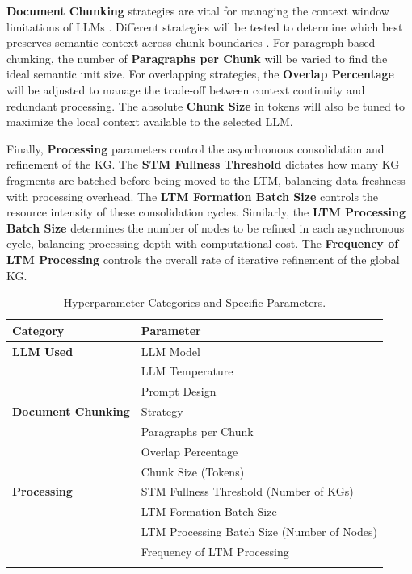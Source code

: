 \textbf{Document Chunking} strategies are vital for managing the context window limitations of LLMs \parencite{RefWorks:RefID:115-ratner2022parallel}. Different strategies will be tested to determine which best preserves semantic context across chunk boundaries \parencite{RefWorks:RefID:104-qu2024semantic}. For paragraph-based chunking, the number of \textbf{Paragraphs per Chunk} will be varied to find the ideal semantic unit size. For overlapping strategies, the \textbf{Overlap Percentage} will be adjusted to manage the trade-off between context continuity and redundant processing. The absolute \textbf{Chunk Size} in tokens will also be tuned to maximize the local context available to the selected LLM.

Finally, \textbf{Processing} parameters control the asynchronous consolidation and refinement of the KG. The \textbf{STM Fullness Threshold} dictates how many KG fragments are batched before being moved to the LTM, balancing data freshness with processing overhead. The \textbf{LTM Formation Batch Size} controls the resource intensity of these consolidation cycles. Similarly, the \textbf{LTM Processing Batch Size} determines the number of nodes to be refined in each asynchronous cycle, balancing processing depth with computational cost. The \textbf{Frequency of LTM Processing} controls the overall rate of iterative refinement of the global KG.
\begin{table}[htbp]
\centering
{}
\caption{Hyperparameter Categories and Specific Parameters.}
\label{tab:hyperparameter_exp_design}
\begin{tabularx}{\textwidth}{@{} lX @{}} 
\toprule
\textbf{Category} & \textbf{Parameter} \\
\midrule
\addlinespace
\textbf{LLM Used} & LLM Model \\
& LLM Temperature \\
& Prompt Design \\
\addlinespace
\hline
\addlinespace
\textbf{Document Chunking} & Strategy \\
& Paragraphs per Chunk \\
& Overlap Percentage \\
& Chunk Size (Tokens) \\
\addlinespace
\hline
\addlinespace
\textbf{Processing} & STM Fullness Threshold (Number of KGs) \\
& LTM Formation Batch Size \\
& LTM Processing Batch Size (Number of Nodes) \\
& Frequency of LTM Processing \\
\addlinespace
\bottomrule
\end{tabularx}
\end{table}

